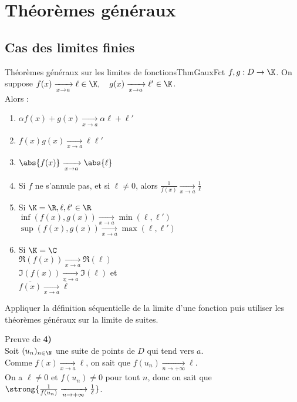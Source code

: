 \documentclass[12pt,a4paper]{report}
\begin{document}
\section{Théorèmes généraux}
\subsection{Cas des limites finies}

\begin{theoreme}{Théorèmes généraux sur les limites de fonctions}{ThmGauxFct}
$f,g : D \to \K$. On suppose $f(x) \xrightarrow[x \to a]{} \ell \in \K, \quad g(x) \xrightarrow[x \to a]{} \ell' \in \K$. \\
Alors : \\
\begin{enumerate}
	\item $\alpha f(x)+g(x) \xrightarrow[x \to a]{} \alpha \ell + \ell'$
	\item $f(x)g(x) \xrightarrow[x \to a]{} \ell \ell'$
	\item $\abs{f(x)} \xrightarrow[x \to a]{} \abs{\ell}$
	\item Si $f$ ne s'annule pas, et si $\ell \neq 0$, alors $\frac{1}{f(x)} \xrightarrow[x \to a]{} \frac{1}{\ell}$
	\item Si $\K = \R, \ell, \ell' \in \R$ \\
		$\inf(f(x),g(x)) \xrightarrow[x \to a]{} \min(\ell, \ell')$ \\
		$\sup(f(x),g(x)) \xrightarrow[x \to a]{} \max(\ell, \ell')$ \\
	\item Si $\K = \C$ \\
		$\Re(f(x)) \xrightarrow[x \to a]{} \Re(\ell)$ \\
		$\Im(f(x)) \xrightarrow[x \to a]{} \Im(\ell)$ et \\
		$\overline{f(x)} \xrightarrow[x \to a]{} \overline{\ell}$
\end{enumerate}
\end{theoreme}

\begin{principedemo}{}
Appliquer la définition séquentielle de la limite d'une fonction puis utiliser les théorèmes généraux sur la limite de suites.
\end{principedemo}

\begin{demo}
Preuve de \textbf{4)} \\
Soit $(u_n)_{n \in \N}$ une suite de points de $D$ qui tend vers $a$. \\
Comme $f(x) \xrightarrow[x \to a]{} \ell$, on sait que $f(u_n) \xrightarrow[n \to +\infty]{} \ell$. \\
On a $\ell \neq 0$ et $f(u_n) \neq 0$ pour tout $n$, donc on sait que $\strong{\frac{1}{f(u_n)} \xrightarrow[n \to +\infty]{} \frac{1}{\ell}}$.
\end{demo}
\end{document}
